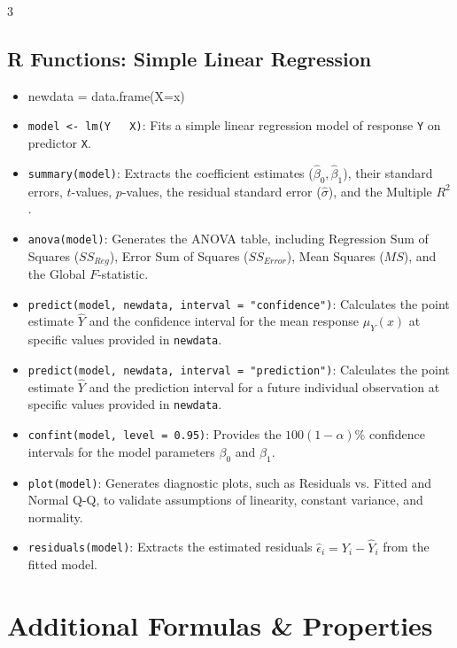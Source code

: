 \documentclass[10pt]{article}
\begin{document}
\begin{multicols}{3}
\begin{itemize}
    \subsection*{R Functions: Simple Linear Regression}
\begin{itemize}
    \item newdata = data.frame(X=x)
    \item \texttt{model <- lm(Y ~ X)}: Fits a simple linear regression model of response \texttt{Y} on predictor \texttt{X}.
    \item \texttt{summary(model)}: Extracts the coefficient estimates ($\hat{\beta}_0, \hat{\beta}_1$), their standard errors, $t$-values, $p$-values, the residual standard error ($\hat{\sigma}$), and the Multiple $R^2$.
    \item \texttt{anova(model)}: Generates the ANOVA table, including Regression Sum of Squares ($SS_{Reg}$), Error Sum of Squares ($SS_{Error}$), Mean Squares ($MS$), and the Global $F$-statistic.
    \item \texttt{predict(model, newdata, interval = "confidence")}: Calculates the point estimate $\hat{Y}$ and the confidence interval for the mean response $\mu_Y(x)$ at specific values provided in \texttt{newdata}.
    \item \texttt{predict(model, newdata, interval = "prediction")}: Calculates the point estimate $\hat{Y}$ and the prediction interval for a future individual observation at specific values provided in \texttt{newdata}.
    \item \texttt{confint(model, level = 0.95)}: Provides the $100(1-\alpha)\%$ confidence intervals for the model parameters $\beta_0$ and $\beta_1$.
    \item \texttt{plot(model)}: Generates diagnostic plots, such as Residuals vs. Fitted and Normal Q-Q, to validate assumptions of linearity, constant variance, and normality.
    \item \texttt{residuals(model)}: Extracts the estimated residuals $\hat{\epsilon}_i = Y_i - \hat{Y}_i$ from the fitted model.
\end{itemize}

    
    
    
\end{itemize}

\section*{Additional Formulas \& Properties}


\end{multicols}
\end{document}
